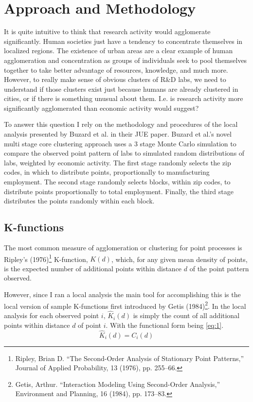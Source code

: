 \documentclass[12pt,letterpaper]{article}
\begin{document}
\section{Approach and Methodology}\label{sec:3}
It is quite intuitive to think that research activity would agglomerate significantly. Human societies just have a tendency to concentrate themselves in localized regions. The existence of urban areas are a clear example of human agglomeration and concentration as groups of individuals seek to pool themselves together to take better advantage of resources, knowledge, and much more. However, to really make sense of obvious clusters of R\&D labs, we need to understand if those clusters exist just because humans are already clustered in cities, or if there is something unusual about them. I.e. is research activity more significantly agglomerated than economic activity would suggest? 
\par
To answer this question I rely on the methodology and procedures of the local analysis presented by Buzard et al. in their JUE paper. Buzard et al.'s novel multi stage core clustering approach uses a 3 stage Monte Carlo simulation to compare the observed point pattern of labs to simulated random distributions of labs, weighted by economic activity. The first stage randomly selects the zip codes, in which to distribute points, proportionally to manufacturing employment. The second stage randomly selects blocks, within zip codes, to distribute points proportionally to total employment. Finally, the third stage distributes the points randomly within each block. 
\subsection{K-functions}
The most common measure of agglomeration or clustering for point processes is Ripley's (1976)\footnote{Ripley, Brian D. “The Second-Order Analysis of Stationary Point Patterns,” Journal of Applied
Probability, 13 (1976), pp. 255–66.} K-function, \(K(d)\), which, for any given mean density of points, is the expected number of additional points within distance \(d\) of the point pattern observed.
\par
However, since I ran a local analysis the main tool for accomplishing this is the local version of sample K-functions first introduced by Getis (1984)\footnote{Getis, Arthur. “Interaction Modeling Using Second-Order Analysis,” Environment and Planning,
16 (1984), pp. 173–83.}. In the local analysis for each observed point \(i\), \(\hat{K}_{i}(d)\) is simply the count of all additional points within distance \(d\) of point \(i\). With the functional form being \eqref{eq:1}. 
\begin{equation}\label{eq:1}
    \hat{K}_{i}(d) = C_{i}(d)
\end{equation}
\end{document}
